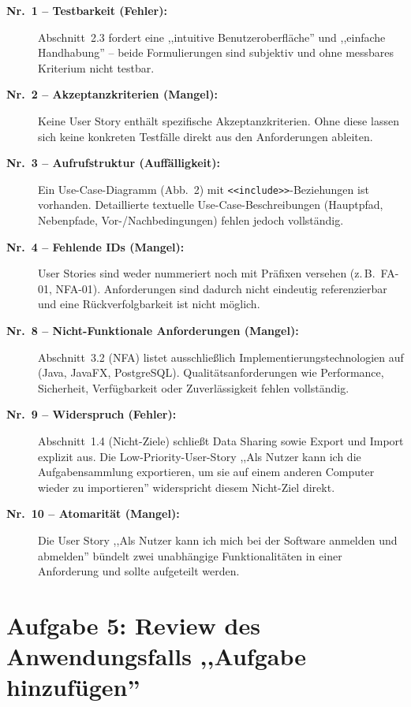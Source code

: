 \documentclass[
	fontsize=12pt,          %
	paper=a4,               %
	numbers=noenddot,       %
	listof=totoc,           %
	listof=entryprefix,     %
	listof=nochaptergap,    %
	bibliography=totoc,     %
	parskip=half,           %
	openany                 %
]{scrbook}
\begin{document}
\begin{description}
	\item[\textbf{Nr.~1 -- Testbarkeit (Fehler):}]
	Abschnitt~2.3 fordert eine ,,intuitive Benutzeroberfläche'' und ,,einfache Handhabung'' -- beide Formulierungen sind subjektiv und ohne messbares Kriterium nicht testbar.

	\item[\textbf{Nr.~2 -- Akzeptanzkriterien (Mangel):}]
	Keine User Story enthält spezifische Akzeptanzkriterien.
	Ohne diese lassen sich keine konkreten Testfälle direkt aus den Anforderungen ableiten.

	\item[\textbf{Nr.~3 -- Aufrufstruktur (Auffälligkeit):}]
	Ein Use-Case-Diagramm (Abb.~2) mit \texttt{<<include>>}-Beziehungen ist vorhanden.
	Detaillierte textuelle Use-Case-Beschreibungen (Hauptpfad, Nebenpfade, Vor-/Nachbedingungen) fehlen jedoch vollständig.

	\item[\textbf{Nr.~4 -- Fehlende IDs (Mangel):}]
	User Stories sind weder nummeriert noch mit Präfixen versehen (z.\,B.\ FA-01, NFA-01).
	Anforderungen sind dadurch nicht eindeutig referenzierbar und eine Rückverfolgbarkeit ist nicht möglich.

	\item[\textbf{Nr.~8 -- Nicht-Funktionale Anforderungen (Mangel):}]
	Abschnitt~3.2 (NFA) listet ausschließlich Implementierungstechnologien auf (Java, JavaFX, PostgreSQL).
	Qualitätsanforderungen wie Performance, Sicherheit, Verfügbarkeit oder Zuverlässigkeit fehlen vollständig.

	\item[\textbf{Nr.~9 -- Widerspruch (Fehler):}]
	Abschnitt~1.4 (Nicht-Ziele) schließt Data Sharing sowie Export und Import explizit aus.
	Die Low-Priority-User-Story ,,Als Nutzer kann ich die Aufgabensammlung exportieren, um sie auf einem anderen Computer wieder zu importieren'' widerspricht diesem Nicht-Ziel direkt.

	\item[\textbf{Nr.~10 -- Atomarität (Mangel):}]
	Die User Story ,,Als Nutzer kann ich mich bei der Software anmelden und abmelden'' bündelt zwei unabhängige Funktionalitäten in einer Anforderung und sollte aufgeteilt werden.
\end{description}


\chapter*{Aufgabe 5: Review des Anwendungsfalls ,,Aufgabe hinzufügen''}
\end{document}
